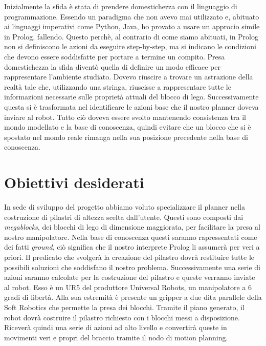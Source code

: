Inizialmente la sfida è stata di prendere domestichezza con il linguaggio di programmazione.
Essendo un paradigma che non avevo mai utilizzato e, abituato ai linguaggi imperativi come Python, Java, ho provato a usare un approcio simile
in Prolog, fallendo. Questo perchè, al contrario di come siamo abituati, in Prolog non si definiscono le azioni da eseguire step-by-step, ma si indicano le condizioni che devono essere soddisfatte per portare a termine un compito.
Presa domestichezza la sfida diventò quella di definire un modo efficace per rappresentare l'ambiente studiato.
Dovevo riuscire a trovare un astrazione della realtà tale che, utilizzando una stringa, riuscisse a rappresentare tutte le informazioni necessarie sulle proprietà
attuali del blocco di lego. Successivamente questa si è trasformata nel identificare le azioni base che il nostro planner doveva inviare al robot.
Tutto ciò doveva essere svolto mantenendo consistenza tra il mondo modellato e la base di conoscenza, quindi evitare che un blocco che si è spostato
nel mondo reale rimanga nella sua posizione precedente nella base di conoscenza. 

\section{Obiettivi desiderati}
\label{sec:obiettdes}
In sede di sviluppo del progetto abbiamo voluto specializzare il planner nella costruzione di pilastri di altezza scelta dall'utente. Questi sono 
composti dai \textit{megablocks}, dei blocchi di lego di dimensione maggiorata, per facilitare la presa al nostro manipolatore. Nella base di conoscenza questi saranno rapressentati come dei fatti \textit{ground}, ciò significa che il nostro 
interprete Prolog li assumerà per veri a priori. Il predicato che svolgerà la creazione del pilastro dovrà restituire tutte le possibili soluzioni che
soddisfano il nostro problema. Successivamente una serie di azioni saranno calcolate per la costruzione del pilastro e queste verranno inviate al robot. Esso è un UR5
del produttore Universal Robots, un manipolatore a 6 gradi di libertà. Alla sua estremità è presente un gripper a due dita parallele della Soft Robotics che permette la presa dei blocchi.
Tramite il piano generato, il robot dovrà costruire il pilastro richiesto con i blocchi messi a disposizione. Riceverà quindi una serie di azioni ad alto
livello e convertirà queste in movimenti veri e propri del braccio tramite il nodo di motion planning.

